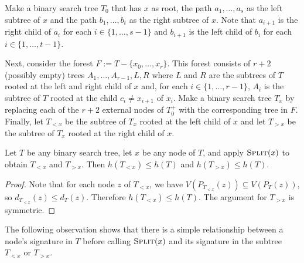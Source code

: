 \documentclass[kpfonts]{patmorin}
\let\le\leqslant
\begin{document}
Make a binary search tree $T_0$ that has $x$ as root, the path $a_1,\ldots,a_s$ as the left subtree of $x$ and the path $b_1,\ldots,b_t$ as the right subtree of $x$.  Note that $a_{i+1}$ is the right child of $a_i$ for each $i\in\{1,\ldots,s-1\}$ and $b_{i+1}$ is the left child of $b_i$ for each $i\in\{1,\ldots,t-1\}$. 

Next, consider the forest $F:=T-\{x_0,\ldots,x_r\}$. This forest consists of $r+2$ (possibly empty) trees $A_1,\ldots,A_{r-1},L,R$ where $L$ and $R$ are the subtrees of $T$ rooted at the left and right child of $x$ and, for each $i\in\{1,\ldots,r-1\}$, $A_i$ is the subtree of $T$ rooted at the child $c_i\neq x_{i+1}$ of $x_i$.  Make a binary search tree $T_x$ by replacing each of the $r+2$ external nodes of $T_0^+$ with the corresponding tree in $F$.  Finally, let $T_{<x}$ be the subtree of $T_x$ rooted at the left child of $x$ and let $T_{>x}$ be the subtree of $T_x$ rooted at the right child of $x$.

\begin{lem}
  Let $T$ be any binary search tree, let $x$ be any node of $T$, and apply $\textsc{Split}(x)$ to obtain $T_{<x}$ and $T_{>x}$.  
  Then $h(T_{<x})\le h(T)$ and $h(T_{>x})\le h(T)$.
\end{lem}

\begin{proof}
  Note that for each node $z$ of $T_{<x}$, we have $V(P_{T_{<x}}(z))\subseteq V(P_T(z))$, 
  so $d_{T_{<x}}(z)\le d_T(z)$. 
  Therefore $h(T_{<x})\le h(T)$. The argument for $T_{>x}$ is symmetric.
\end{proof}

The following observation shows that there is a simple relationship between a node's signature in $T$ before calling $\textsc{Split}(x)$ and its signature in the subtree $T_{<x}$ or $T_{>x}$.
\end{document}

